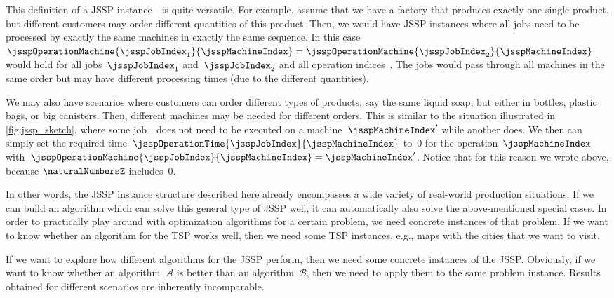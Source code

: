 This definition of a \gls{JSSP} instance~\instance\ is quite versatile.
For example, assume that we have a factory that produces exactly one single product, but different customers may order different quantities of this product.
Then, we would have \gls{JSSP} instances where all jobs need to be processed by exactly the same machines in exactly the same sequence.
In this case~$\jsspOperationMachine{\jsspJobIndex_1}{\jsspMachineIndex}=\jsspOperationMachine{\jsspJobIndex_2}{\jsspMachineIndex}$ would hold for all jobs~$\jsspJobIndex_1$ and~$\jsspJobIndex_2$ and all operation indices~\jsspMachineIndex.
The jobs would pass through all machines in the same order but may have different processing times (due to the different quantities).

We may also have scenarios where customers can order different types of products, say the same liquid soap, but either in bottles, plastic bags, or big canisters.
Then, different machines may be needed for different orders.
This is similar to the situation illustrated in \autoref{fig:jssp_sketch}, where some job~\jsspJobIndex\ does not need to be executed on a machine~$\jsspMachineIndex'$ while another does.
We then can simply set the required time~$\jsspOperationTime{\jsspJobIndex}{\jsspMachineIndex}$ to~0 for the operation~$\jsspMachineIndex$ with~$\jsspOperationMachine{\jsspJobIndex}{\jsspMachineIndex}=\jsspMachineIndex'$.
Notice that for this reason we wrote \inQuotes{$\jsspOperationTime{\jsspJobIndex}{\jsspMachineIndex}\in\naturalNumbersZ$} above, because $\naturalNumbersZ$ includes~0.

In other words, the \gls{JSSP} instance structure described here already encompasses a wide variety of real-world production situations.
If we can build an algorithm which can solve this general type of \gls{JSSP} well, it can automatically also solve the above-mentioned special cases.
\endhsection%
%
%
\label{sec:jsspBenchmarkInstances}%
%
In order to practically play around with optimization algorithms for a certain problem, we need concrete instances of that problem.
If we want to know whether an algorithm for the \gls{TSP} works well, then we need some \gls{TSP} instances, e.g., maps with the cities that we want to visit.

If we want to explore how different algorithms for the \gls{JSSP} perform, then we need some concrete instances of the \gls{JSSP}.
Obviously, if we want to know whether an algorithm~$\mathcal{A}$ is better than an algorithm~$\mathcal{B}$, then we need to apply them to the same problem instance.
Results obtained for different scenarios are inherently incomparable.


